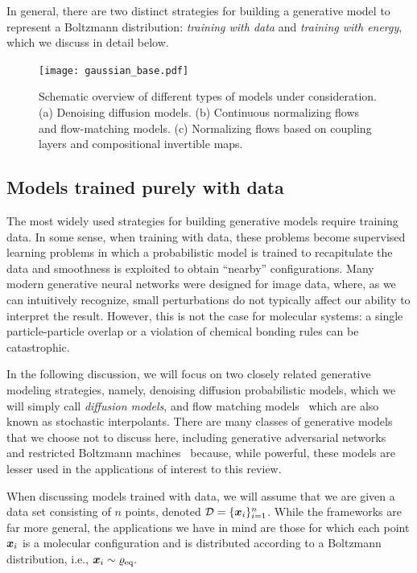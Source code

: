 \documentclass[11pt]{article}
\begin{document}
In general, there are two distinct strategies for building a generative model to represent a Boltzmann distribution: \emph{training with data} and \emph{training with energy}, which we discuss in detail below. 

\begin{figure}
\begin{center}
\texttt{[image: gaussian\_base.pdf]}
\end{center}
\caption{Schematic overview of different types of models under consideration. (a) Denoising diffusion models. (b) Continuous normalizing flows and flow-matching models. (c) Normalizing flows based on coupling layers and compositional invertible maps.}
\label{fig:models}
\end{figure}

\subsection{Models trained purely with data}

The most widely used strategies for building generative models require training data.
In some sense, when training with data, these problems become supervised learning problems in which a probabilistic model is trained to recapitulate the data and smoothness is exploited to obtain ``nearby'' configurations.
Many modern generative neural networks were designed for image data, where, as we can intuitively recognize, small perturbations do not typically affect our ability to interpret the result. 
However, this is not the case for molecular systems: a single particle-particle overlap or a violation of chemical bonding rules can be catastrophic. 

In the following discussion, we will focus on two closely related generative modeling strategies, namely, denoising diffusion probabilistic models, which we will simply call \emph{diffusion models}, and flow matching models~\cite{lipman_flow_2022, albergo_building_2022, albergo_stochastic_2023} which are also known as stochastic interpolants.  
There are many classes of generative models that we choose not to discuss here, including generative adversarial networks~\cite{goodfellow_generative_2014} and restricted Boltzmann machines~\cite{salakhutdinov_restricted_2007, salakhutdinov_deep_2009} because, while powerful, these models are lesser used in the applications of interest to this review. 

When discussing models trained with data, we will assume that we are given a data set consisting of $n$ points, denoted $\mathcal{D} = \{ \boldsymbol{x}_i \}_{i=1}^n$.
While the frameworks are far more general, the applications we have in mind are those for which each point $\boldsymbol{x}_i$ is a molecular configuration and is distributed according to a Boltzmann distribution, i.e., $\boldsymbol{x}_i \sim \varrho_{\rm eq}.$
\end{document}
